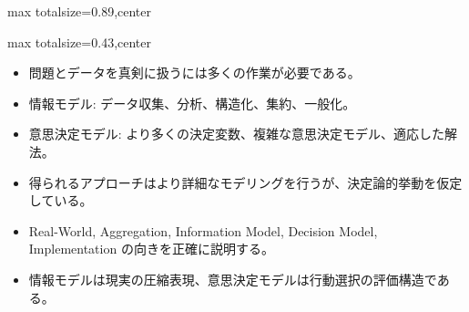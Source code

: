 \begin{minipage}[t]{0.58\textwidth}
\begin{adjustbox}{max totalsize={\textwidth}{0.89\textheight},center}
\begin{minipage}{\textwidth}
\end{minipage}
\end{adjustbox}
\end{minipage}


\clearpage
{}
\begin{minipage}[t]{0.405\textwidth}
\begin{adjustbox}{max totalsize={\textwidth}{0.43\textheight},center}
\begin{minipage}{\textwidth}\scriptsize
{}\begin{itemize}
\item 問題とデータを真剣に扱うには多くの作業が必要である。
\item 情報モデル: データ収集、分析、構造化、集約、一般化。
\item 意思決定モデル: より多くの決定変数、複雑な意思決定モデル、適応した解法。
\item 得られるアプローチはより詳細なモデリングを行うが、決定論的挙動を仮定している。
\end{itemize}\begin{itemize}
\item Real-World, Aggregation, Information Model, Decision Model, Implementation の向きを正確に説明する。
\item 情報モデルは現実の圧縮表現、意思決定モデルは行動選択の評価構造である。
\end{itemize}
\end{minipage}
\end{adjustbox}
\end{minipage}\hfill
